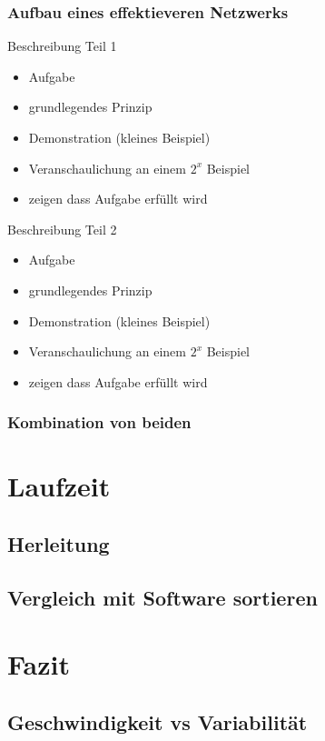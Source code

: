\documentclass[ucs,9pt]{beamer}
\begin{document}
\subsubsection{Aufbau eines effektieveren Netzwerks}
\begin{frame}{Beschreibung Teil 1}
\begin{itemize}
\item Aufgabe
\item grundlegendes Prinzip
\item Demonstration (kleines Beispiel)
\item Veranschaulichung an einem $2^x$ Beispiel
\item zeigen dass Aufgabe erfüllt wird
\end{itemize}
\end{frame}
\begin{frame}{Beschreibung Teil 2}
\begin{itemize}
\item Aufgabe
\item grundlegendes Prinzip
\item Demonstration (kleines Beispiel)
\item Veranschaulichung an einem $2^x$ Beispiel
\item zeigen dass Aufgabe erfüllt wird
\end{itemize}
\end{frame}
\subsubsection{Kombination von beiden}


\section{Laufzeit}
\subsection{Herleitung}
\subsection{Vergleich mit Software sortieren}

\section{Fazit}
\subsection{Geschwindigkeit vs Variabilität}
\end{document}
